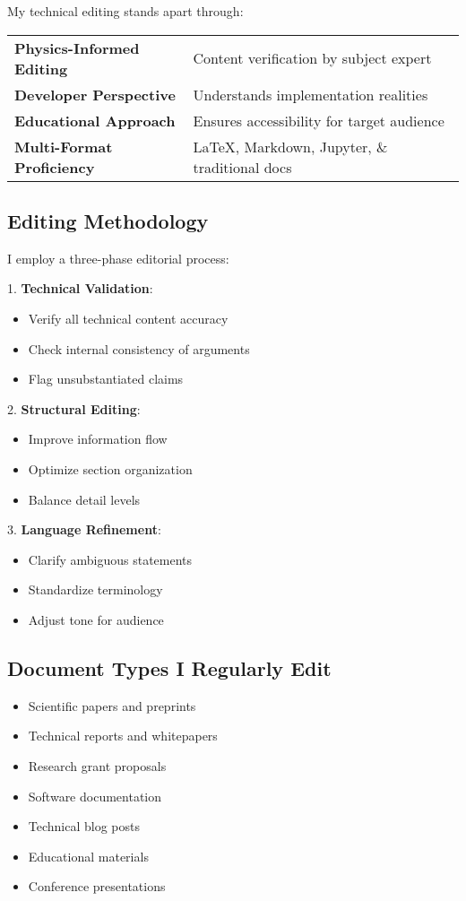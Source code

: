 \documentclass[11pt]{article}
\begin{document}
My technical editing stands apart through:

\begin{tabular}{ll}
\textbf{Physics-Informed Editing} & Content verification by subject expert \\
\textbf{Developer Perspective} & Understands implementation realities \\
\textbf{Educational Approach} & Ensures accessibility for target audience \\
\textbf{Multi-Format Proficiency} & LaTeX, Markdown, Jupyter, \& traditional docs \\
\end{tabular}

\subsection*{Editing Methodology}

I employ a three-phase editorial process:

1. \textbf{Technical Validation}:
   \begin{itemize}
   \item Verify all technical content accuracy
   \item Check internal consistency of arguments
   \item Flag unsubstantiated claims
   \end{itemize}

2. \textbf{Structural Editing}:
   \begin{itemize}
   \item Improve information flow
   \item Optimize section organization
   \item Balance detail levels
   \end{itemize}

3. \textbf{Language Refinement}:
   \begin{itemize}
   \item Clarify ambiguous statements
   \item Standardize terminology
   \item Adjust tone for audience
   \end{itemize}

\subsection*{Document Types I Regularly Edit}

\begin{itemize}
\item Scientific papers and preprints
\item Technical reports and whitepapers
\item Research grant proposals
\item Software documentation
\item Technical blog posts
\item Educational materials
\item Conference presentations
\end{itemize}
\end{document}
